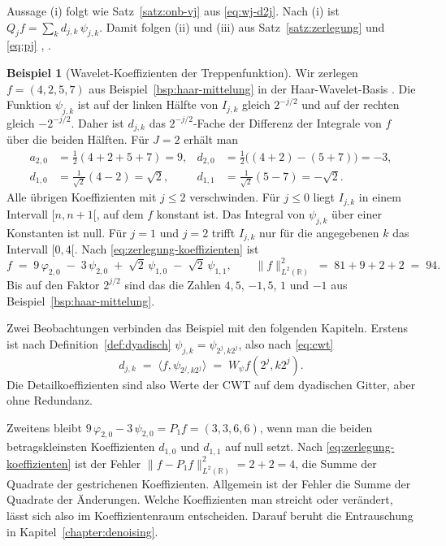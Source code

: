 \documentclass[a4paper,11pt,bibliography=totoc,listof=totoc,headinclude=true,cleardoublepage=empty,oneside]{scrbook}
\theoremstyle{plain}
\theoremstyle{definition}
\newtheorem{Beispiel}[Satz]{Beispiel}
\newcommand{\R}{\mathbb{R}}
\newcommand{\LZwei}{L^2(\R)}
\newcommand{\scal}[2]{\langle #1, #2 \rangle}
\newcommand{\norm}[1]{\lVert #1 \rVert}
\begin{document}
Aussage (i) folgt wie Satz~\ref{satz:onb-vj} aus \eqref{eq:wj-d2j}. Nach (i)
ist $Q_j f = \sum_k d_{j,k}\,\psi_{j,k}$. Damit folgen (ii) und (iii) aus
Satz~\ref{satz:zerlegung} und \eqref{eq:pj} \cite[Kap.~5.1]{blatter}, %
\cite[Gl.~(2.2.13)]{lmr}. %

\begin{Beispiel}[Wavelet-Koeffizienten der Treppenfunktion]
\label{bsp:haar-wavelet-koeff}
Wir zerlegen $f = (4,2,5,7)$ aus Beispiel~\ref{bsp:haar-mittelung} in der
Haar-Wavelet-Basis \cite[Kap.~2.2]{lmr}. %
Die Funktion $\psi_{j,k}$ ist auf der linken Hälfte von $I_{j,k}$ gleich
$2^{-j/2}$ und auf der rechten gleich $-2^{-j/2}$. Daher ist $d_{j,k}$ das
$2^{-j/2}$-Fache der Differenz der Integrale von $f$ über die beiden Hälften.
Für $J = 2$ erhält man
\begin{align*}
  a_{2,0} &= \tfrac12(4+2+5+7) = 9, &
  d_{2,0} &= \tfrac12\bigl((4+2)-(5+7)\bigr) = -3,\\
  d_{1,0} &= \tfrac{1}{\sqrt2}(4-2) = \sqrt2, &
  d_{1,1} &= \tfrac{1}{\sqrt2}(5-7) = -\sqrt2 .
\end{align*}
Alle übrigen Koeffizienten mit $j \le 2$ verschwinden. Für $j \le 0$ liegt
$I_{j,k}$ in einem Intervall $[n,n+1[$, auf dem $f$ konstant ist. Das Integral
von $\psi_{j,k}$ über einer Konstanten ist null. Für $j = 1$ und $j = 2$ trifft
$I_{j,k}$ nur für die angegebenen $k$ das Intervall $[0,4[$. Nach
\eqref{eq:zerlegung-koeffizienten} ist
\[
  f \;=\; 9\,\varphi_{2,0} \;-\; 3\,\psi_{2,0} \;+\; \sqrt2\,\psi_{1,0} \;-\; \sqrt2\,\psi_{1,1},
  \qquad
  \norm{f}_{\LZwei}^2 \;=\; 81 + 9 + 2 + 2 \;=\; 94 .
\]
Bis auf den Faktor $2^{j/2}$ sind das die Zahlen $4{,}5$, $-1{,}5$, $1$ und $-1$
aus Beispiel~\ref{bsp:haar-mittelung}.

Zwei Beobachtungen verbinden das Beispiel mit den folgenden Kapiteln. Erstens
ist nach Definition~\ref{def:dyadisch} $\psi_{j,k} = \psi_{2^j,k2^j}$, also
nach \eqref{eq:cwt}
\[
  d_{j,k} \;=\; \scal{f}{\psi_{2^j,k2^j}} \;=\; W_\psi f(2^{j}, k2^{j}) .
\]
Die Detailkoeffizienten sind also Werte der CWT auf dem dyadischen Gitter,
aber ohne Redundanz.

Zweitens bleibt $9\,\varphi_{2,0} - 3\,\psi_{2,0} = P_1 f = (3,3,6,6)$, wenn man
die beiden betragskleinsten Koeffizienten $d_{1,0}$ und $d_{1,1}$ auf null
setzt. Nach \eqref{eq:zerlegung-koeffizienten} ist der Fehler
$\norm{f - P_1 f}_{\LZwei}^2 = 2 + 2 = 4$, die Summe der Quadrate der gestrichenen
Koeffizienten. Allgemein ist der Fehler die Summe der Quadrate der Änderungen.
Welche Koeffizienten man streicht oder verändert, lässt sich also im
Koeffizientenraum entscheiden. Darauf beruht die Entrauschung in
Kapitel~\ref{chapter:denoising}.
\end{Beispiel}
\end{document}

